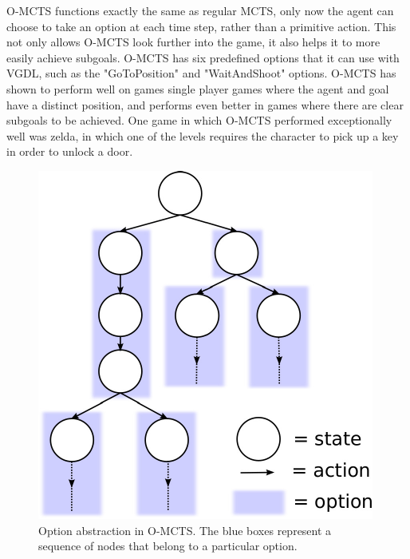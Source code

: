 \documentclass[12pt,a4paper]{article}
\begin{document}
\begin{multicols}{2}
O-MCTS functions exactly the same as regular MCTS, only now the agent can choose to take an option at each time step, rather than a primitive action. This not only allows O-MCTS look further into the game, it also helps it to more easily achieve subgoals. O-MCTS has six predefined options that it can use with VGDL, such as the "GoToPosition" and "WaitAndShoot" options. O-MCTS has shown to perform well on games single player games where the agent and goal have a distinct position, and performs even better in games where there are clear subgoals to be achieved. One game in which O-MCTS performed exceptionally well was zelda, in which one of the levels requires the character to pick up a key in order to unlock a door.

\begin{figure}[H]
    \includegraphics[width=\linewidth]{omcts-eps-converted-to.pdf}
    \caption{Option abstraction in O-MCTS. The blue boxes represent a sequence of nodes that belong to a particular option. \cite{de2016monte}}
\end{figure}


\end{multicols}
\end{document}
